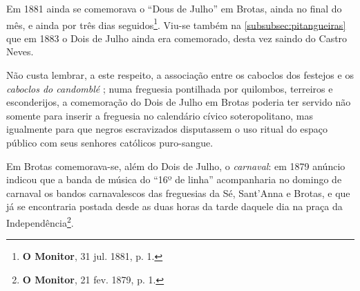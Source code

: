 Em 1881 ainda se comemorava o ``Dous de Julho'' em Brotas, ainda no final do mês, e ainda por três dias seguidos\footnote{\textbf{O Monitor}, 31 jul. 1881, p. 1.}. Viu-se também na \autoref{subsubsec:pitangueiras} que em 1883 o Dois de Julho ainda era comemorado, desta vez saindo do Castro Neves.

Não custa lembrar, a este respeito, a associação entre os caboclos dos festejos e os \textit{caboclos do candomblé} \cite[p.~88-91]{albuquerque_doisdejulho_1997}; numa freguesia pontilhada por quilombos, terreiros e esconderijos, a comemoração do Dois de Julho em Brotas poderia ter servido não somente para inserir a freguesia no calendário cívico soteropolitano, mas igualmente para que negros escravizados disputassem o uso ritual do espaço público com seus senhores católicos puro-sangue. 

Em Brotas comemorava-se, além do Dois de Julho, o \textit{carnaval}: em 1879 anúncio indicou que a banda de música do ``16º de linha'' acompanharia no domingo de carnaval os bandos carnavalescos das freguesias da Sé, Sant'Anna e Brotas, e que já se encontraria postada desde as duas horas da tarde daquele dia na praça da Independência\footnote{\textbf{O Monitor}, 21 fev. 1879, p. 1.}.

